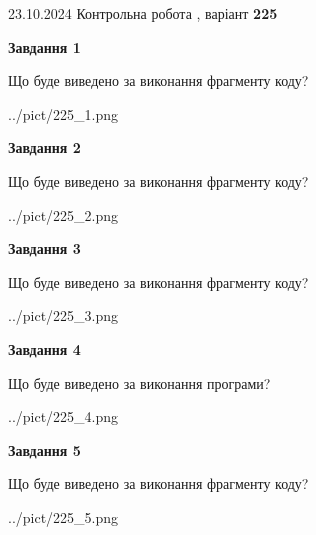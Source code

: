 \documentclass[12pt, ukrainian]{article}
\begin{document}
{\Large{23.10.2024 Контрольна робота , варіант  \No \textbf { 225 }\par}}
{
\begin {large}
{\begin {center}\textbf{Завдання 1}\end {center}}

Що буде виведено за виконання фрагменту коду?\par
\begin{center}
	{../pict/225_1.png}
\end{center}
\newpage

{\begin {center}\textbf{Завдання 2}\end {center}}

Що буде виведено за виконання фрагменту коду?\par
\begin{center}
	{../pict/225_2.png}
\end{center}
\newpage

{\begin {center}\textbf{Завдання 3}\end {center}}

Що буде виведено за виконання фрагменту коду?\par
\begin{center}
	{../pict/225_3.png}
\end{center}
\newpage

{\begin {center}\textbf{Завдання 4}\end {center}}

Що буде виведено за виконання програми?\par
\begin{center}
	{../pict/225_4.png}
\end{center}
\newpage

{\begin {center}\textbf{Завдання 5}\end {center}}

Що буде виведено за виконання фрагменту коду?\par
\begin{center}
	{../pict/225_5.png}
\end{center}
\newpage


\end{large}}
\end{document}
